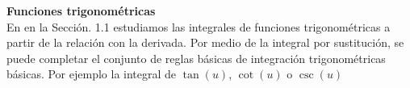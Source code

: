 


\noindent \textcolor{red!50!black}{\Large \bf   Funciones trigonom\'etricas} \\

\noindent
En en la Secci\'on. 1.1 estudiamos las integrales de funciones trigonom\'etricas a partir de la relaci\'on con la
derivada. Por medio de la integral por sustituci\'on, se puede completar el conjunto de reglas
b\'asicas de integraci\'on   trigonom\'etricas b\'asicas. Por ejemplo la integral de $\tan(u)$, $\cot(u)$ o
$\csc(u)$ \\

%
%
%


